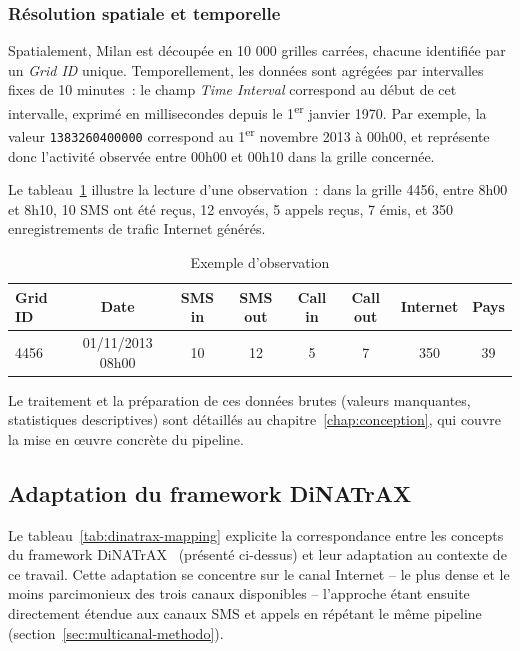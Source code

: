 \subsubsection{Résolution spatiale et temporelle}

Spatialement, Milan est découpée en 10 000 grilles carrées, chacune
identifiée par un \emph{Grid ID} unique. Temporellement, les données
sont agrégées par intervalles fixes de 10 minutes~: le champ
\emph{Time Interval} correspond au début de cet intervalle, exprimé
en millisecondes depuis le 1\textsuperscript{er} janvier 1970. Par
exemple, la valeur \texttt{1383260400000} correspond au 1\textsuperscript{er}
novembre 2013 à 00h00, et représente donc l'activité observée entre
00h00 et 00h10 dans la grille concernée.

Le tableau~\ref{tab:example-obs} illustre la lecture d'une
observation~: dans la grille 4456, entre 8h00 et 8h10, 10 SMS ont été
reçus, 12 envoyés, 5 appels reçus, 7 émis, et 350 enregistrements de
trafic Internet générés.

\begin{table}[htbp]
  \centering
  \caption{Exemple d'observation}
  \label{tab:example-obs}
  \begin{tabular}{lccccccc}
    \toprule
    \textbf{Grid ID} & \textbf{Date} & \textbf{SMS in} & \textbf{SMS out} & \textbf{Call in} & \textbf{Call out} & \textbf{Internet} & \textbf{Pays} \\
    \midrule
    4456 & 01/11/2013 08h00 & 10 & 12 & 5 & 7 & 350 & 39 \\
    \bottomrule
  \end{tabular}
\end{table}

Le traitement et la préparation de ces données brutes (valeurs
manquantes, statistiques descriptives) sont détaillés au
chapitre~\ref{chap:conception}, qui couvre la mise en œuvre concrète
du pipeline.

\subsection{Adaptation du framework DiNATrAX}

Le tableau~\ref{tab:dinatrax-mapping} explicite la correspondance
entre les concepts du framework DiNATrAX~\parencite{maudoux2024dinatrax}
(présenté ci-dessus) et leur adaptation au contexte de ce
travail. Cette adaptation se concentre sur le canal Internet -- le
plus dense et le moins parcimonieux des trois canaux disponibles --
l'approche étant ensuite directement étendue aux canaux SMS et appels
en répétant le même pipeline (section~\ref{sec:multicanal-methodo}).

